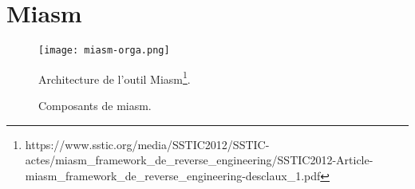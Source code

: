 \chapter{Miasm}
\begin{figure}[h]
    \centering
    \texttt{[image: miasm-orga.png]}
    \caption{Composants de miasm.}
    Architecture de l'outil Miasm\footnote{https://www.sstic.org/media/SSTIC2012/SSTIC-actes/miasm\_framework\_de\_reverse\_engineering/SSTIC2012-Article-miasm\_framework\_de\_reverse\_engineering-desclaux\_1.pdf}.
\end{figure}
